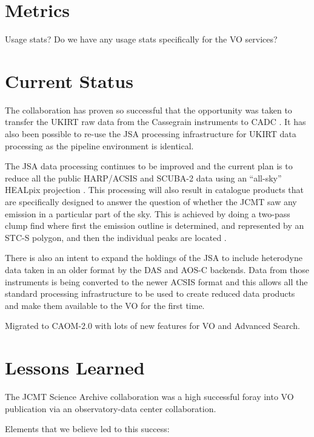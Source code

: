 \documentclass[final,authoryear,5p,times,twocolumn]{elsarticle}
\begin{document}
\section{Metrics}

{\color{red}
Usage stats? Do we have any usage stats specifically for the VO services?
}

\section{Current Status}

The collaboration has proven so successful that the opportunity was
taken to transfer the UKIRT raw data from the Cassegrain instruments
to CADC \citep{adassxxiii_P01}. It has also been possible to re-use
the JSA processing infrastructure for UKIRT data processing as the
pipeline environment is identical.

The JSA data processing continues to be improved
\citep{2014JCMTN35..19J} and the current plan is to reduce all the
public HARP/ACSIS and SCUBA-2 data using an ``all-sky'' HEALpix
projection \citep{2014SPIE9152-93,2014JCMTN35..20B}. This processing
will also result in catalogue products that are specifically designed
to answer the question of whether the JCMT saw any emission in a
particular part of the sky. This is achieved by doing a two-pass clump
find where first the emission outline is determined, and represented
by an STC-S polygon, and then the individual peaks are located
\citep{2014JCMTN35..21G}.

There is also an intent to expand the holdings of the JSA to include
heterodyne data taken in an older format by the DAS
\citep{1986SPIE..598..134B} and AOS-C backends. Data from those
instruments is being converted to the newer ACSIS format and this
allows all the standard processing infrastructure to be used to create
reduced data products and make them available to the VO for the first
time.

{\color{red}
Migrated to CAOM-2.0 \citep{2013ASPC..475..159R,2012ASPC..461..339D}
with lots of new features for VO and Advanced Search.
}

\section{Lessons Learned}

The JCMT Science Archive collaboration was a high successful foray
into VO publication via an observatory-data center collaboration.

Elements that we believe led to this success:
\end{document}
